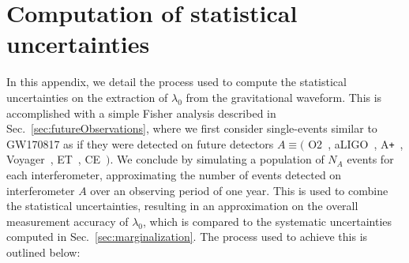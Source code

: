 \documentclass[prd,twocolumn,nofootinbib,superscriptaddress,amsmath,amssymb]{revtex4-1}
\begin{document}

\appendix

\section{Computation of statistical uncertainties}\label{app:stackingProcedure}

In this appendix, we detail the process used to compute the statistical uncertainties on the extraction of $\lambda_0$ from the gravitational waveform.
This is accomplished with a simple Fisher analysis described in Sec.~\ref{sec:futureObservations}, where we first consider single-events similar to GW170817 as if they were detected on future detectors $A \equiv ($ O2~\cite{aLIGO}, aLIGO~\cite{aLIGO}, A\texttt{+}~\cite{Ap_Voyager_CE}, Voyager~\cite{Ap_Voyager_CE}, ET~\cite{ET}, CE~\cite{Ap_Voyager_CE}$)$.
We conclude by simulating a population of $N_A$ events for each interferometer, approximating the number of events detected on interferometer $A$ over an observing period of one year.
This is used to combine the statistical uncertainties, resulting in an approximation on the overall measurement accuracy of $\lambda_0$, which is compared to the systematic uncertainties computed in Sec.~\ref{sec:marginalization}.
The process used to achieve this is outlined below:
\end{document}

